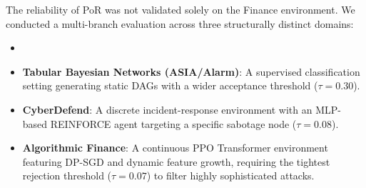\documentclass[journal]{IEEEtran}
\begin{document}
The reliability of PoR was not validated solely on the Finance environment. We conducted a multi-branch evaluation across three structurally distinct domains:
\begin{itemize}
\item  \item \textbf{Tabular Bayesian Networks (ASIA/Alarm)}: A supervised classification setting generating static DAGs with a wider acceptance threshold ($\tau=0.30$). \item \textbf{CyberDefend}: A discrete incident-response environment with an MLP-based REINFORCE agent targeting a specific sabotage node ($\tau=0.08$). \item \textbf{Algorithmic Finance}: A continuous PPO Transformer environment featuring DP-SGD and dynamic feature growth, requiring the tightest rejection threshold ($\tau=0.07$) to filter highly sophisticated attacks. \end{itemize}
\end{document}
